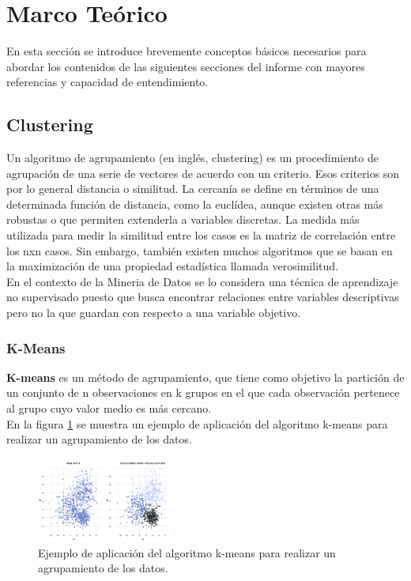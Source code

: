 \documentclass[osajnl,twocolumn,showpacs,superscriptaddress,10pt]{revtex4-1} %
\begin{document}
\section{Marco Teórico}

En esta sección se introduce brevemente conceptos básicos necesarios para abordar los contenidos de las siguientes secciones del informe con mayores referencias y capacidad de entendimiento. \\

\subsection{Clustering}

Un algoritmo de agrupamiento (en inglés, clustering) es un procedimiento de agrupación de una serie de vectores de acuerdo con un criterio. Esos criterios son por lo general distancia o similitud. La cercanía se define en términos de una determinada función de distancia, como la euclídea, aunque existen otras más robustas o que permiten extenderla a variables discretas. La medida más utilizada para medir la similitud entre los casos es la matriz de correlación entre los nxn casos. Sin embargo, también existen muchos algoritmos que se basan en la maximización de una propiedad estadística llamada verosimilitud. \\

En el contexto de la Mineria de Datos se lo considera una técnica de aprendizaje no supervisado puesto que busca encontrar relaciones entre variables descriptivas pero no la que guardan con respecto a una variable objetivo. \\

\subsubsection{K-Means}

\textbf{K-means} es un método de agrupamiento, que tiene como objetivo la partición de un conjunto de n observaciones en k grupos en el que cada observación pertenece al grupo cuyo valor medio es más cercano. \\

En la figura \ref{figure:clustering_example} se muestra un ejemplo de aplicación del algoritmo k-means para realizar un agrupamiento de los datos.

\begin{figure}[H]
    \centering
    \includegraphics[width=0.4\textwidth]{theory/clustering}
    \caption{Ejemplo de aplicación del algoritmo k-means para realizar un agrupamiento de los datos.}
    \label{figure:clustering_example}
\end{figure}
\end{document}
